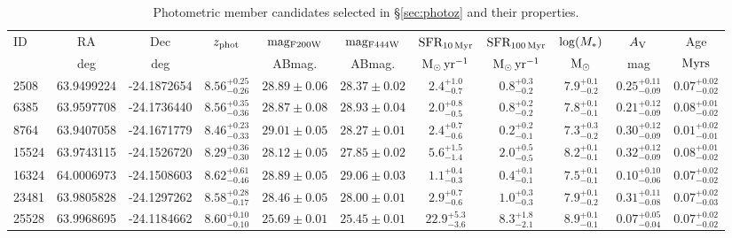 \documentclass[twocolumn]{aastex631}
\begin{document}
\begin{table}[h]
    \centering
    \renewcommand{\tabcolsep}{0.12cm}
    \caption{Photometric member candidates selected in \S\ref{sec:photoz} and their  properties.}
    \begin{tabular}{lcccccccccc}
    \hline
       ID  &  RA & Dec &  $z_{\rm phot}$ & ${\rm mag_{F200W}}$ &  ${\rm mag_{F444W}}$ & ${\rm SFR_{10\,Myr}}$ & ${\rm SFR_{100\,Myr}}$ & ${\rm log}(M_{\ast})$ & $A_{\rm V}$ & Age \\
       & deg & deg & & ABmag. & ABmag. & ${\rm M_{\odot}\,yr^{-1}}$ & ${\rm M_{\odot}\,yr^{-1}}$ &    ${\rm M_{\odot}}$ & {\rm mag} & ${\rm Myrs}$ \\
    \hline
    2508 & 63.9499224 & -24.1872654 & $8.56^{+0.25}_{-0.26}$ & $28.89\pm0.06$& $28.37\pm0.02 $ &$2.4^{+1.0}_{-0.7}$ & $0.8^{+0.3}_{-0.2}$ & $7.9^{+0.1}_{-0.2}$ & $0.25^{+0.11}_{-0.09}$ & $0.07^{+0.02}_{-0.02}$\\
    6385 & 63.9597708 & -24.1736440 & $8.56^{+0.35}_{-0.36}$ & $28.87\pm0.08$& $28.93\pm0.04 $ & $2.0^{+0.8}_{-0.5}$& $0.8^{+0.2}_{-0.2}$ & $7.8^{+0.1}_{-0.1}$ & $0.21^{+0.12}_{-0.09}$ & $0.08^{+0.01}_{-0.02}$\\
    8764 & 63.9407058 & -24.1671779 & $8.46^{+0.23}_{-0.33}$ & $29.01\pm0.05$& $28.27\pm0.01 $ & $2.4^{+0.7}_{-0.6}$ & $0.2^{+0.2}_{-0.1}$ & $7.3^{+0.3}_{-0.2}$ & $0.30^{+0.12}_{-0.09}$ & $0.01^{+0.02}_{-0.01}$\\
    15524 & 63.9743115 & -24.1526720 & $8.29^{+0.36}_{-0.30}$ & $28.12\pm0.05$& $27.85\pm0.02 $ & $5.6^{+1.5}_{-1.4}$ & $2.0^{+0.5}_{-0.5}$ & $8.2^{+0.1}_{-0.1}$ & $0.32^{+0.12}_{-0.09}$ & $0.08^{+0.01}_{-0.02}$\\
    16324 & 64.0006973 & -24.1508603 & $8.62^{+0.61}_{-0.46}$& $28.89\pm0.05$& $29.06\pm0.03 $ & $1.1^{+0.4}_{-0.3}$ & $0.4^{+0.1}_{-0.1}$ & $7.5^{+0.1}_{-0.1}$ & $0.10^{+0.10}_{-0.06}$ & $0.07^{+0.02}_{-0.02}$\\
    23481 & 63.9805828 & -24.1297262 & $8.58^{+0.28}_{-0.17}$ & $28.46\pm0.05$& $28.00\pm0.01 $ & $2.9^{+0.7}_{-0.6}$ & $1.0^{+0.3}_{-0.3}$ & $7.9^{+0.1}_{-0.2}$ & $0.31^{+0.11}_{-0.08}$ & $0.07^{+0.02}_{-0.03}$\\
    25528 & 63.9968695 & -24.1184662 & $8.60^{+0.10}_{-0.10}$ & $25.69\pm0.01$& $25.45\pm0.01 $ & $22.9^{+5.3}_{-3.6}$ & $8.3^{+1.8}_{-2.1}$ & $8.9^{+0.1}_{-0.1}$ & $0.07^{+0.05}_{-0.04}$ & $0.07^{+0.02}_{-0.02}$\\
    \hline
    \end{tabular}
    \label{tab:photoz}
\end{table}
\end{document}
